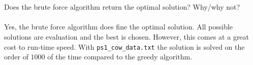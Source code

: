 \documentclass[letterpaper,11pt]{article}
\begin{document}
\section{}
Does the brute force algorithm return the optimal solution? Why/why not? \\
\\
Yes, the brute force algorithm does fine the optimal solution.
All possible solutions are evaluation and the best is chosen. 
However, this comes at a great cost to run-time speed.
With \texttt{ps1\_cow\_data.txt} the solution is solved on the order of $1000$ of the time compared to the greedy algorithm. 
\end{document}
